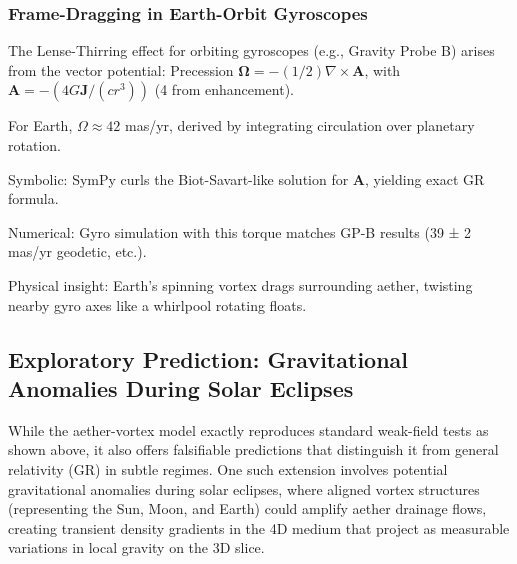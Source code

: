 \documentclass{article}
\begin{document}
\subsubsection{Frame-Dragging in Earth-Orbit Gyroscopes}

The Lense-Thirring effect for orbiting gyroscopes (e.g., Gravity Probe B) arises from the vector potential: Precession $\boldsymbol{\Omega} = - (1/2) \nabla \times \mathbf{A}$, with $\mathbf{A} = - (4 G \mathbf{J} / (c r^3))$ (4 from enhancement).

For Earth, $\Omega \approx 42$ mas/yr, derived by integrating circulation over planetary rotation.

Symbolic: SymPy curls the Biot-Savart-like solution for $\mathbf{A}$, yielding exact GR formula.

Numerical: Gyro simulation with this torque matches GP-B results (39 ± 2 mas/yr geodetic, etc.).

Physical insight: Earth's spinning vortex drags surrounding aether, twisting nearby gyro axes like a whirlpool rotating floats.

\medskip
\noindent
{}
\medskip

\subsection{Exploratory Prediction: Gravitational Anomalies During Solar Eclipses}

While the aether-vortex model exactly reproduces standard weak-field tests as shown above, it also offers falsifiable predictions that distinguish it from general relativity (GR) in subtle regimes. One such extension involves potential gravitational anomalies during solar eclipses, where aligned vortex structures (representing the Sun, Moon, and Earth) could amplify aether drainage flows, creating transient density gradients in the 4D medium that project as measurable variations in local gravity on the 3D slice.
\end{document}
